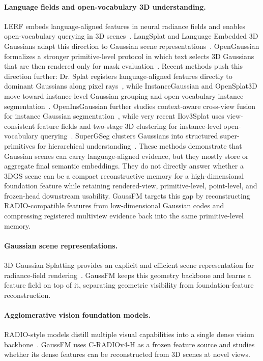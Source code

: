 \documentclass[journal,twoside]{IEEEtran}
\newcommand{\method}{GaussFM}
\newcommand{\radio}{C-RADIOv4-H}
\begin{document}
\paragraph{Language fields and open-vocabulary 3D understanding.}
LERF embeds language-aligned features in neural radiance fields and enables
open-vocabulary querying in 3D scenes~\cite{kerr2023lerf}. LangSplat and
Language Embedded 3D Gaussians adapt this direction to Gaussian scene
representations~\cite{qin2024langsplat,shi2024legaussians}. OpenGaussian
formalizes a stronger primitive-level protocol in which text selects 3D
Gaussians that are then rendered only for mask
evaluation~\cite{wu2024opengaussian}. Recent methods push this direction
further: Dr. Splat registers language-aligned features directly to dominant
Gaussians along pixel rays~\cite{kim2025drsplat}, while InstanceGaussian and
OpenSplat3D move toward instance-level Gaussian grouping
and open-vocabulary instance segmentation~\cite{li2025instancegaussian,piekenbrinck2025opensplat3d}.
OpenInsGaussian further studies context-aware cross-view fusion for instance
Gaussian segmentation~\cite{huang2025openinsgaussian}, while very recent
Ilov3Splat uses view-consistent feature fields and two-stage 3D clustering for
instance-level open-vocabulary querying~\cite{nguyen2026ilov3splat}.
SuperGSeg clusters Gaussians into structured super-primitives for hierarchical
understanding~\cite{liang2026supergseg}. These methods demonstrate that
Gaussian scenes can carry language-aligned evidence, but they mostly store or
aggregate final semantic embeddings. They do not directly answer whether a
3DGS scene can be a compact reconstructive memory for a high-dimensional
foundation feature while retaining rendered-view, primitive-level, point-level,
and frozen-head downstream usability. \method{} targets this gap by
reconstructing RADIO-compatible features from low-dimensional Gaussian codes and
compressing registered multiview evidence back into the same primitive-level
memory.

\paragraph{Gaussian scene representations.}
3D Gaussian Splatting provides an explicit and efficient scene representation
for radiance-field rendering~\cite{kerbl2023gaussians}. \method{} keeps this
geometry backbone and learns a feature field on top of it, separating geometric
visibility from foundation-feature reconstruction.

\paragraph{Agglomerative vision foundation models.}
RADIO-style models distill multiple visual capabilities into a single dense
vision backbone~\cite{ranzinger2024radio,nvidia2026cradiov4}. \method{} uses
\radio{} as a frozen feature source and studies whether its dense features can be
reconstructed from 3D scenes at novel views.
\end{document}
